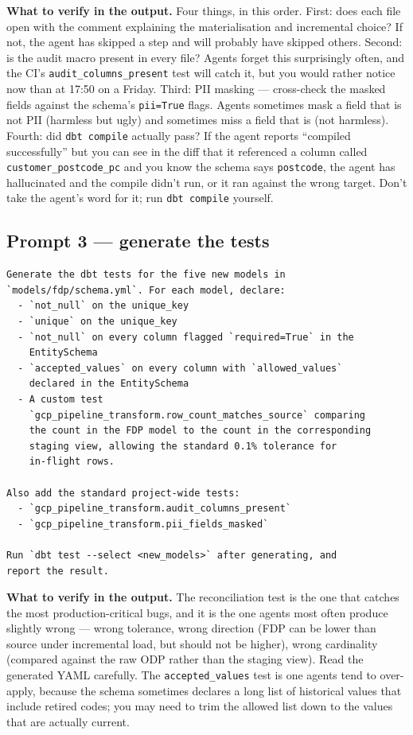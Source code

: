 \documentclass[
  11pt,
  british,
  oneside]{book}
\begin{document}
\textbf{What to verify in the output.} Four things, in this order.
First: does each file open with the comment explaining the
materialisation and incremental choice? If not, the agent has skipped a
step and will probably have skipped others. Second: is the audit macro
present in every file? Agents forget this surprisingly often, and the
CI's \texttt{audit\_columns\_present} test will catch it, but you would
rather notice now than at 17:50 on a Friday. Third: PII masking ---
cross-check the masked fields against the schema's \texttt{pii=True}
flags. Agents sometimes mask a field that is not PII (harmless but ugly)
and sometimes miss a field that is (not harmless). Fourth: did
\texttt{dbt\ compile} actually pass? If the agent reports ``compiled
successfully'' but you can see in the diff that it referenced a column
called \texttt{customer\_postcode\_pc} and you know the schema says
\texttt{postcode}, the agent has hallucinated and
the compile didn't run, or it ran against the wrong target. Don't take
the agent's word for it; run \texttt{dbt\ compile} yourself.

\hypertarget{prompt-3-generate-the-tests}{%
\subsection{Prompt 3 --- generate the
tests}\label{prompt-3-generate-the-tests}}

\begin{verbatim}
Generate the dbt tests for the five new models in
`models/fdp/schema.yml`. For each model, declare:
  - `not_null` on the unique_key
  - `unique` on the unique_key
  - `not_null` on every column flagged `required=True` in the
    EntitySchema
  - `accepted_values` on every column with `allowed_values`
    declared in the EntitySchema
  - A custom test
    `gcp_pipeline_transform.row_count_matches_source` comparing
    the count in the FDP model to the count in the corresponding
    staging view, allowing the standard 0.1% tolerance for
    in-flight rows.

Also add the standard project-wide tests:
  - `gcp_pipeline_transform.audit_columns_present`
  - `gcp_pipeline_transform.pii_fields_masked`

Run `dbt test --select <new_models>` after generating, and
report the result.
\end{verbatim}

\textbf{What to verify in the output.} The reconciliation test is the
one that catches the most production-critical bugs, and it is the one
agents most often produce slightly wrong --- wrong tolerance, wrong
direction (FDP can be lower than source under incremental load, but
should not be higher), wrong cardinality (compared against the raw ODP
rather than the staging view). Read the generated YAML carefully. The
\texttt{accepted\_values} test is one agents tend to over-apply, because
the schema sometimes declares a long list of historical values that
include retired codes; you may need to trim the allowed list down to the
values that are actually current.
\end{document}
